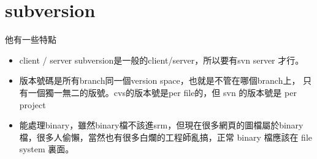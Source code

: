 \section{subversion}
  他有一些特點
  \begin{itemize}
    \item client / server subversion是一般的client/server，所以要有svn server
      才行。
    \item 版本號碼是所有branch同一個version space，也就是不管在哪個branch上，
      只有一個獨一無二的版號。cvs的版本號是per file的，但 svn 的版本號是
      per project
    \item 能處理binary，雖然binary檔不該進srm，但現在很多網頁的圖檔屬於binary
      檔，很多人偷懶，當然也有很多白爛的工程師亂搞，正常 binary 檔應該在 file 
      system 裏面。
  \end{itemize}

